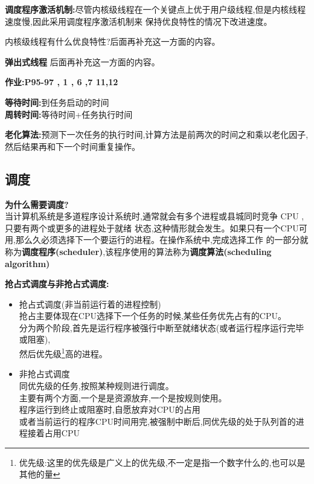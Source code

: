\documentclass[UTF8,a4paper]{ctexart}
\newcommand{\spaceline}{\vspace{\baselineskip}}
\begin{document}
    \textbf{调度程序激活机制:}尽管内核级线程在一个关键点上优于用户级线程,但是内核线程速度慢,因此采用调度程序激活机制来
    保持优良特性的情况下改进速度。

    {\color{red}内核级线程有什么优良特性?后面再补充这一方面的内容。}

    \spaceline
    \textbf{弹出式线程}
    {\color{red}后面再补充这一方面的内容。}

    \spaceline
    \textbf{作业:P95-97 , 1 , 6 ,7 11,12}

    \spaceline
    \textbf{等待时间:}到任务启动的时间\\
    \textbf{周转时间:}等待时间+任务执行时间

    \spaceline
    \textbf{老化算法:}预测下一次任务的执行时间,计算方法是前两次的时间之和乘以老化因子,然后结果再和下一个时间重复操作。

    \subsection{调度}
    \textbf{为什么需要调度?}\\
    当计算机系统是多道程序设计系统时,通常就会有多个进程或县城同时竞争 CPU ,只要有两个或更多的进程处于就绪
    状态,这种情形就会发生。如果只有一个CPU可用,那么久必须选择下一个要运行的进程。在操作系统中,完成选择工作
    的一部分就称为\textbf{调度程序(scheduler)},该程序使用的算法称为\textbf{调度算法(scheduling algorithm)}

    \spaceline
    \textbf{抢占式调度与非抢占式调度:}
    \begin{itemize}
      \item 抢占式调度(非当前运行着的进程控制)\\
      抢占主要体现在CPU选择下一个任务的时候,某些任务优先占有的CPU。\\
      分为两个阶段,首先是运行程序被强行中断至就绪状态(或者运行程序运行完毕或阻塞),\\
      然后优先级\footnote{优先级:这里的优先级是广义上的优先级,不一定是指一个数字什么的,也可以是其他的量}高的进程。

      \item 非抢占式调度\\
      同优先级的任务,按照某种规则进行调度。\\
      主要有两个方面,一个是是资源放弃,一个是按规则使用。\\
      程序运行到终止或阻塞时,自愿放弃对CPU的占用\\
      或者当前运行的程序CPU时间用完,被强制中断后,同优先级的处于队列首的进程接着占用CPU
    \end{itemize}
\end{document}
